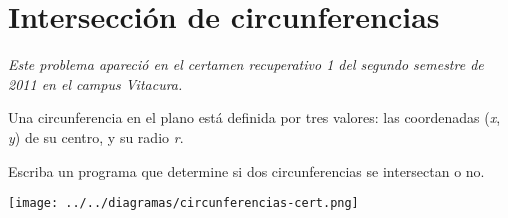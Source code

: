 \section{Intersección de circunferencias}

\emph{Este problema apareció en el certamen recuperativo 1 del segundo
semestre de 2011 en el campus Vitacura.}

Una circunferencia en el plano está definida por tres valores: las
coordenadas (\emph{x}, \emph{y}) de su centro, y su radio \emph{r}.

Escriba un programa que determine si dos circunferencias se intersectan
o no.

\texttt{[image: ../../diagramas/circunferencias-cert.png]}
